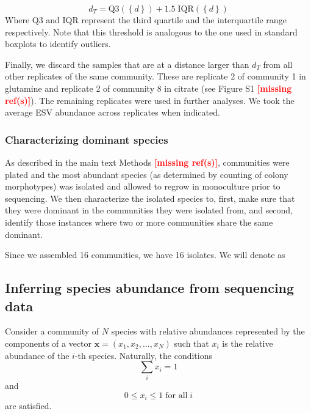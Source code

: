 \documentclass[a4paper,10pt]{article}
\newcommand{\mr}{\textcolor{red}{\textbf{[missing ref(s)]}}}
\begin{document}
\begin{equation}
d_T = \mathrm{Q}3 \left( \left\{d\right\} \right) + 
1.5 \; \mathrm{IQR} \left( \left\{d\right\} \right)
\label{supp-eqn:threshold}
\end{equation}
%
Where Q3 and IQR represent the third quartile and the interquartile range
respectively. Note that this threshold is analogous to the one used in
standard boxplots to identify outliers.

Finally, we discard the samples that are at a distance larger than $d_T$ from
all other replicates of the same community. These are replicate 2 of community
1 in glutamine and replicate 2 of community 8 in citrate (see Figure S1 \mr).
The remaining replicates were used in further analyses. We took the average
ESV abundance across replicates when indicated.

\subsubsection{Characterizing dominant species}\label{supp-methods:data-proc:doms}

As described in the main text Methods \mr, communities were plated and the most
abundant species (as determined by counting of colony morphotypes) was isolated
and allowed to regrow in monoculture prior to sequencing. We then characterize
the isolated species to, first, make sure that they were dominant in the communities
they were isolated from, and second, identify those instances where two or more
communities share the same dominant.

Since we assembled 16 communities, we have 16 isolates. We will denote as 

\subsection{Inferring species abundance from sequencing data}
\label{supp-methods:species-from-seq}

Consider a community of $N$ species with relative abundances represented
by the components of a vector $\mathbf{x} = \left( x_1, x_2, \dotsc,
x_N\right)$ such that $x_i$ is the relative abundance of the $i$-th species.
Naturally, the conditions
%
\begin{equation}
\sum_i x_i = 1
\label{supp-eqn:normx_1}
\end{equation}
%
and
%
\begin{equation}
0 \leq x_i \leq 1 \; \textrm{for all} \; i
\label{supp-eqn:normx_2}
\end{equation}
%
are satisfied.
\end{document}
